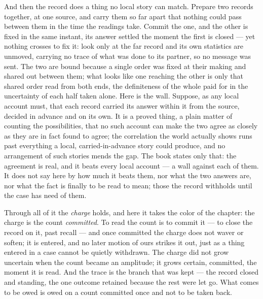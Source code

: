 And then the record does a thing no local story can match. Prepare two records together, at one source, and
carry them so far apart that nothing could pass between them in the time the readings take. Commit the one, and
the other is fixed in the same instant, its answer settled the moment the first is closed --- yet nothing
crosses to fix it: look only at the far record and its own statistics are unmoved, carrying no trace of what was
done to its partner, so no message was sent. The two are bound because a single order was fixed at their making
and shared out between them; what looks like one reaching the other is only that shared order read from both
ends, the definiteness of the whole paid for in the uncertainty of each half taken alone. Here is the wall. Suppose, as any local account must, that each
record carried its answer within it from the source, decided in advance and on its own. It is a proved thing, a
plain matter of counting the possibilities, that no such account can make the two agree as closely as they are
in fact found to agree; the correlation the world actually shows runs past everything a local, carried-in-advance
story could produce, and no arrangement of such stories mends the gap. The book states only that: the agreement
is real, and it beats every local account --- a wall against each of them. It does not say here by how much it
beats them, nor what the two answers are, nor what the fact is finally to be read to mean; those the record
withholds until the case has need of them.

Through all of it the \emph{charge} holds, and here it takes the color of the chapter: the charge is the count
\emph{committed}. To read the count is to commit it --- to close the record on it, past recall --- and once
committed the charge does not waver or soften; it is entered, and no later motion of ours strikes it out, just
as a thing entered in a case cannot be quietly withdrawn. The charge did not grow uncertain when the count
became an amplitude; it grows certain, committed, the moment it is read. And the trace is the branch that was
kept --- the record closed and standing, the one outcome retained because the rest were let go. What comes to be
owed is owed on a count committed once and not to be taken back.

